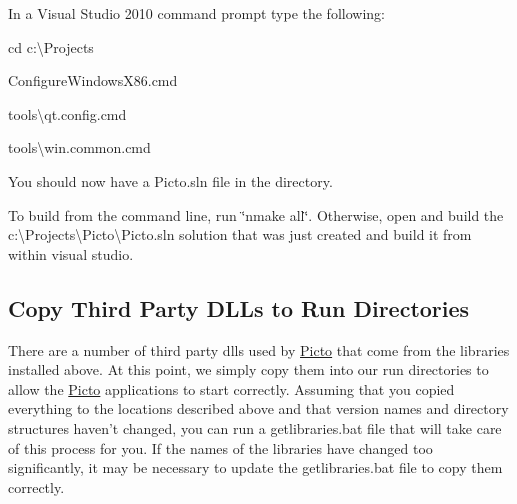 \begin{DoxyEnumerate}
\item In a Visual Studio 2010 command prompt type the following\-:
\begin{DoxyEnumerate}
\item cd c\-:\textbackslash{}Projects
\item Configure\-Windows\-X86.\-cmd
\item tools\textbackslash{}qt.\-config.cmd
\item tools\textbackslash{}win.\-common.cmd
\end{DoxyEnumerate}
\item You should now have a Picto.\-sln file in the  directory.
\begin{DoxyEnumerate}
\item To build from the command line, run \char`\"{}nmake all\char`\"{}. Otherwise, open and build the c\-:\textbackslash{}Projects\textbackslash{}\-Picto\textbackslash{}\-Picto.\-sln solution that was just created and build it from within visual studio.
\end{DoxyEnumerate}
\end{DoxyEnumerate}\hypertarget{build_environment_preparation_copy_3rd_party_dlls}{}\subsection{Copy Third Party D\-L\-Ls to Run Directories}\label{build_environment_preparation_copy_3rd_party_dlls}
There are a number of third party dlls used by \hyperlink{namespace_picto}{Picto} that come from the libraries installed above. At this point, we simply copy them into our run directories to allow the \hyperlink{namespace_picto}{Picto} applications to start correctly. Assuming that you copied everything to the locations described above and that version names and directory structures haven't changed, you can run a getlibraries.\-bat file that will take care of this process for you. If the names of the libraries have changed too significantly, it may be necessary to update the getlibraries.\-bat file to copy them correctly.



